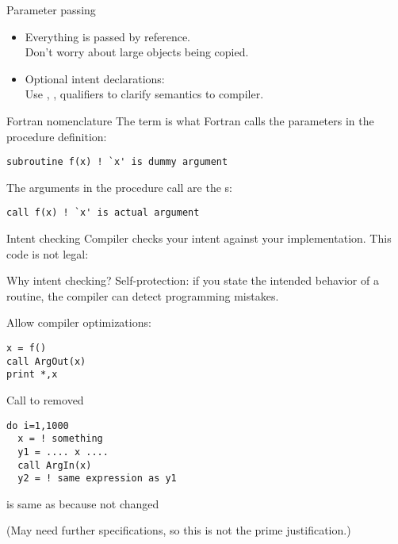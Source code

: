\begin{block}{Parameter passing}
  \label{sl:fpassing}
  \begin{itemize}
  \item Everything is passed by reference.\\
    Don't worry about large objects being copied.
  \item Optional intent declarations:\\
    Use , ,  qualifiers to clarify semantics
    to compiler.
  \end{itemize}
\end{block}

\begin{block}{Fortran nomenclature}
  \label{sl:fortran-dummy}
  The term  is what Fortran calls the
  parameters in the procedure definition:
\begin{lstlisting}
subroutine f(x) ! `x' is dummy argument
\end{lstlisting}
  The arguments in the
  procedure call are the s:
\begin{lstlisting}
call f(x) ! `x' is actual argument
\end{lstlisting}
\end{block}

\begin{block}{Intent checking}
  \label{sl:fintent}
  Compiler checks your intent against your implementation. This code
  is not legal:

\end{block}

\begin{block}{Why intent checking?}
\label{sl:intentwhy}
Self-protection: if you state the intended behavior of a routine, the
compiler can detect programming mistakes.

Allow compiler optimizations:

\begin{multicols}{2}
\begin{lstlisting}
x = f()
call ArgOut(x)
print *,x
\end{lstlisting}
Call to  removed
\vfill\columnbreak
\begin{lstlisting}
do i=1,1000
  x = ! something
  y1 = .... x ....
  call ArgIn(x)
  y2 = ! same expression as y1
\end{lstlisting}
 is same as  because  not changed
\end{multicols}
(May need further specifications, so this is not the prime justification.)
\end{block}

